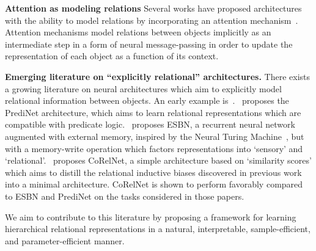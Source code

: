 \textbf{Attention as modeling relations} Several works have proposed architectures with the ability to model relations by incorporating an attention mechanism~\citep{vaswani2017attention,locatelloObjectCentricLearningSlot2020,santoroRelationalRecurrent2018,zambaldiDeepReinforcementLearning2018,velickovicGraphAttentionNetworks2017}. Attention mechanisms model relations between objects implicitly as an intermediate step in a form of neural message-passing in order to update the representation of each object as a function of its context.

\textbf{Emerging literature on ``explicitly relational'' architectures.} There exists a growing literature on neural architectures which aim to explicitly model relational information between objects. An early example is~\citep{santoroSimpleNeural2017}.~\citep{shanahanExplicitlyRelationalNeural} proposes the PrediNet architecture, which aims to learn relational representations which are compatible with predicate logic.~\citep{webbEmergentSymbols2021} proposes ESBN, a recurrent neural network augmented with external memory, inspired by the Neural Turing Machine~\citep{gravesNeuralTuringMachines2014}, but with a memory-write operation which factors representations into `sensory' and `relational'.~\citep{kergNeuralArchitecture2022} proposes CoRelNet, a simple architecture based on `similarity scores' which aims to distill the relational inductive biases discovered in previous work into a minimal architecture. CoRelNet is shown to perform favorably compared to ESBN and PrediNet on the tasks considered in those papers.

We aim to contribute to this literature by proposing a framework for learning hierarchical relational representations in a natural, interpretable, sample-efficient, and parameter-efficient manner.